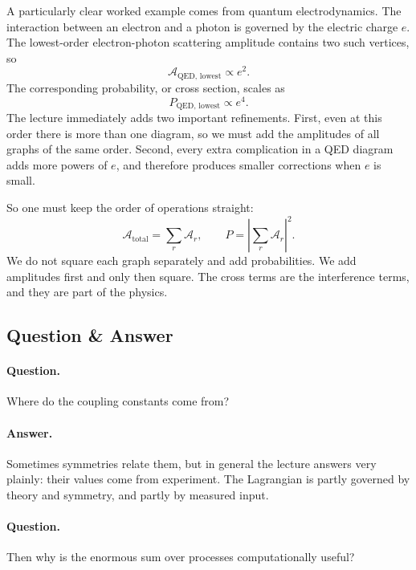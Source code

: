 A particularly clear worked example comes from quantum electrodynamics. The interaction between an electron and a photon is governed by the electric charge \(e\). The lowest-order electron-photon scattering amplitude contains two such vertices, so
\begin{equation}
\mathcal{A}_{\mathrm{QED,\,lowest}}\propto e^2.
\end{equation}
The corresponding probability, or cross section, scales as
\begin{equation}
P_{\mathrm{QED,\,lowest}}\propto e^4.
\end{equation}
The lecture immediately adds two important refinements. First, even at this order there is more than one diagram, so we must add the amplitudes of all graphs of the same order. Second, every extra complication in a QED diagram adds more powers of \(e\), and therefore produces smaller corrections when \(e\) is small.

So one must keep the order of operations straight:
\begin{equation}
\mathcal{A}_{\mathrm{total}}=\sum_r \mathcal{A}_r,
\qquad
P=\left|\sum_r \mathcal{A}_r\right|^2.
\end{equation}
We do not square each graph separately and add probabilities. We add amplitudes first and only then square. The cross terms are the interference terms, and they are part of the physics.

\subsection{Question \& Answer}

\paragraph{Question.} Where do the coupling constants come from?

\paragraph{Answer.} Sometimes symmetries relate them, but in general the lecture answers very plainly: their values come from experiment. The Lagrangian is partly governed by theory and symmetry, and partly by measured input.

\paragraph{Question.} Then why is the enormous sum over processes computationally useful?

